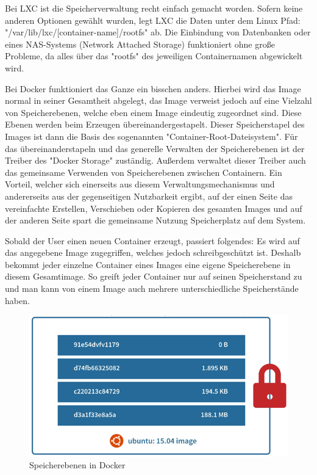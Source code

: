 
Bei LXC ist die Speicherverwaltung recht einfach gemacht worden. Sofern keine anderen Optionen gewählt wurden, legt LXC die Daten unter dem Linux Pfad: "/var/lib/lxc/[container-name]/rootfs" ab. Die Einbindung von Datenbanken oder eines NAS-Systems (Network Attached Storage) funktioniert ohne große Probleme, da alles über das "rootfs" des jeweiligen Containernamen abgewickelt wird.

Bei Docker funktioniert das Ganze ein bisschen anders. Hierbei wird das Image normal in seiner Gesamtheit abgelegt, das Image verweist jedoch auf eine Vielzahl von Speicherebenen, welche eben einem Image eindeutig zugeordnet sind. Diese Ebenen werden beim Erzeugen übereinandergestapelt. Dieser Speicherstapel des Images ist dann die Basis des sogenannten "Container-Root-Dateisystem". Für das übereinanderstapeln und das generelle Verwalten der Speicherebenen ist der Treiber des "Docker Storage" zuständig. Außerdem verwaltet dieser Treiber auch das gemeinsame Verwenden von Speicherebenen zwischen Containern. Ein Vorteil, welcher sich einerseits aus diesem Verwaltungsmechanismus und andererseits aus der gegenseitigen Nutzbarkeit ergibt, auf der einen Seite das vereinfachte Erstellen, Verschieben oder Kopieren des gesamten Images und auf der anderen Seite spart die gemeinsame Nutzung Speicherplatz auf dem System.

Sobald der User einen neuen Container erzeugt, passiert folgendes: Es wird auf das angegebene Image zugegriffen, welches jedoch schreibgeschützt ist. Deshalb bekommt jeder einzelne Container eines Images eine eigene Speicherebene in diesem Gesamtimage. So greift jeder Container nur auf seinen Speicherstand zu und man kann von einem Image auch mehrere unterschiedliche Speicherstände haben.

\begin{figure}[H]
    \centering
    \includegraphics{media/DockerAndContainering/Speicherebenen.png}
    \caption{Speicherebenen in Docker \cite{LxcVsDocker}}
\end{figure}

